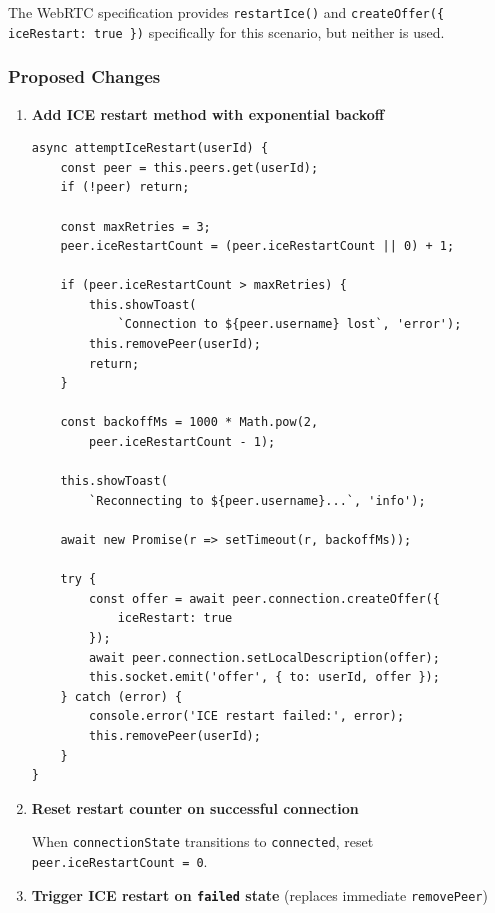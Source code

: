 \documentclass[11pt,letterpaper]{article}
\begin{document}
The WebRTC specification provides \texttt{restartIce()} and \texttt{createOffer(\{ iceRestart: true \})} specifically for this scenario, but neither is used.

\subsubsection{Proposed Changes}

\begin{enumerate}[leftmargin=2em]
    \item \textbf{Add ICE restart method with exponential backoff}

    \begin{verbatim}
async attemptIceRestart(userId) {
    const peer = this.peers.get(userId);
    if (!peer) return;

    const maxRetries = 3;
    peer.iceRestartCount = (peer.iceRestartCount || 0) + 1;

    if (peer.iceRestartCount > maxRetries) {
        this.showToast(
            `Connection to ${peer.username} lost`, 'error');
        this.removePeer(userId);
        return;
    }

    const backoffMs = 1000 * Math.pow(2,
        peer.iceRestartCount - 1);

    this.showToast(
        `Reconnecting to ${peer.username}...`, 'info');

    await new Promise(r => setTimeout(r, backoffMs));

    try {
        const offer = await peer.connection.createOffer({
            iceRestart: true
        });
        await peer.connection.setLocalDescription(offer);
        this.socket.emit('offer', { to: userId, offer });
    } catch (error) {
        console.error('ICE restart failed:', error);
        this.removePeer(userId);
    }
}
    \end{verbatim}

    \item \textbf{Reset restart counter on successful connection}

    When \texttt{connectionState} transitions to \texttt{connected}, reset \texttt{peer.iceRestartCount = 0}.

    \item \textbf{Trigger ICE restart on \texttt{failed} state} (replaces immediate \texttt{removePeer})
\end{enumerate}

\newpage

\end{document}
